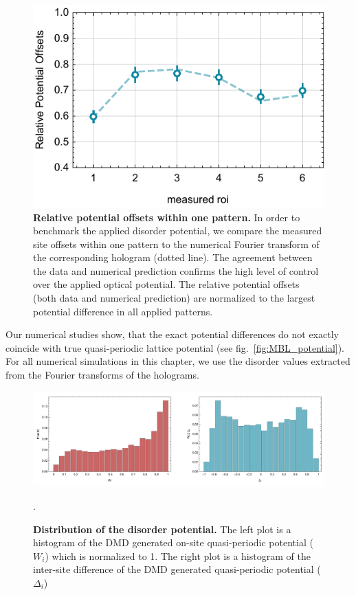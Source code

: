 \begin{figure}[t]
	\centering
	\includegraphics{figures/MBL_disorder_cal_roi.pdf}
	\caption{\label{fig:roi_cal} \textbf {Relative potential offsets within one pattern.} In order to benchmark the applied disorder potential, we compare the measured site offsets within one pattern to the numerical Fourier transform of the corresponding hologram (dotted line). The agreement between the data and numerical prediction confirms the high level of control over the applied optical potential. The relative potential offsets (both data and numerical prediction) are normalized to the largest potential difference in all applied patterns.}
\end{figure}

Our numerical studies show, that the exact potential differences do not exactly coincide with true quasi-periodic lattice potential (see fig.~\ref{fig:MBL_potential}). For all numerical simulations in this chapter, we use the disorder values extracted from the Fourier transforms of the holograms.

\begin{figure}[t]
	\centering
	\includegraphics[width=140mm]{figures/MBL_dists_combo.pdf}
	\caption{\label{fig:DistRow} {\bf Distribution of the disorder potential.}  The left plot is a histogram of the DMD generated on-site quasi-periodic potential ($W_i$) which is normalized to 1. The right plot is a histogram of the inter-site difference of the DMD generated quasi-periodic potential ($\Delta_i$)  }.
\end{figure}

